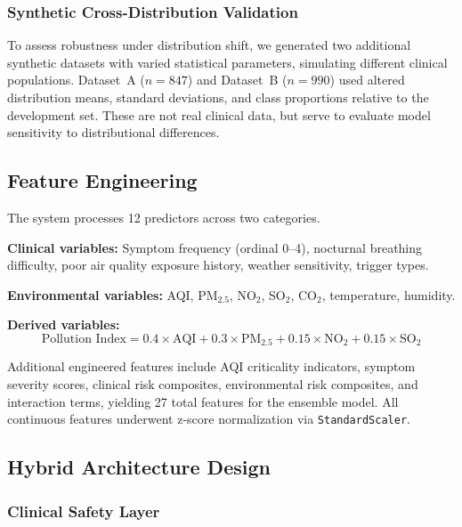 \documentclass[11pt,a4paper]{article}
\begin{document}
\subsubsection{Synthetic Cross-Distribution Validation}

To assess robustness under distribution shift, we generated two additional synthetic
datasets with varied statistical parameters, simulating different clinical populations.
Dataset~A ($n = 847$) and Dataset~B ($n = 990$) used altered distribution means, standard
deviations, and class proportions relative to the development set. These are not real
clinical data, but serve to evaluate model sensitivity to distributional differences.

\subsection{Feature Engineering}

The system processes 12 predictors across two categories.

\textbf{Clinical variables:} Symptom frequency (ordinal 0--4), nocturnal breathing
difficulty, poor air quality exposure history, weather sensitivity, trigger types.

\textbf{Environmental variables:} AQI, PM$_{2.5}$, NO$_2$, SO$_2$, CO$_2$,
temperature, humidity.

\textbf{Derived variables:}
\begin{equation}
  \text{Pollution Index} = 0.4 \times \text{AQI} + 0.3 \times \text{PM}_{2.5}
                          + 0.15 \times \text{NO}_2 + 0.15 \times \text{SO}_2
  \label{eq:pollution}
\end{equation}

Additional engineered features include AQI criticality indicators, symptom severity
scores, clinical risk composites, environmental risk composites, and
interaction terms, yielding 27 total features for the ensemble model.
All continuous features underwent z-score normalization via \texttt{StandardScaler}.

\subsection{Hybrid Architecture Design}

\subsubsection{Clinical Safety Layer}
\end{document}
